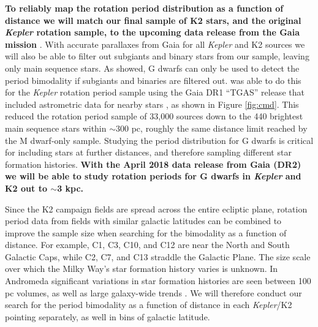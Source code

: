 \documentclass[12pt]{article}
\newcommand{\Kepler}{\textsl{Kepler}\xspace}
\begin{document}
{\bf To reliably map the rotation period distribution as a function of distance we will match our final sample of K2 stars, and the original \Kepler rotation sample, to the upcoming data release from the Gaia mission} \citep{perryman2001}. With accurate parallaxes from Gaia for all \Kepler and K2 sources we will also be able to filter out subgiants and binary stars from our sample, leaving only main sequence stars. As \citet{davenport2017} showed, G dwarfs can only be used to detect the period bimodality if subgiants and binaries are filtered out.\citet{davenport2017} was able to do this for the \Kepler rotation period sample using the Gaia DR1 ``TGAS'' release that included astrometric data for nearby stars \citep{gaia_dr1}, as shown in Figure \ref{fig:cmd}. This reduced the \citet{mcquillan2014} rotation period sample of 33,000 sources down to the 440 brightest main sequence stars within $\sim$300 pc, roughly the same distance limit reached by the M dwarf-only sample. Studying the period distribution for G dwarfs is critical for including stars at further distances, and therefore sampling different star formation histories. {\bf With the April 2018 data release from Gaia (DR2) we will be able to study rotation periods for G dwarfs in \Kepler and K2 out to $\sim$3 kpc.}





Since the K2 campaign fields are spread across the entire ecliptic plane, rotation period data from fields with similar galactic latitudes can be combined to improve the sample size when searching for the bimodality as a function of distance. For example, C1, C3, C10, and C12 are near the North and South Galactic Caps, while C2, C7, and C13 straddle the Galactic Plane. The size scale over which the Milky Way's star formation history varies is unknown. In Andromeda significant variations in star formation histories are seen between 100 pc volumes, as well as large galaxy-wide trends \citep[e.g.][]{lewis2015}. We will therefore conduct our search for the period bimodality as a function of distance in each \Kepler/K2 pointing separately, as well in bins of galactic latitude.
\end{document}
